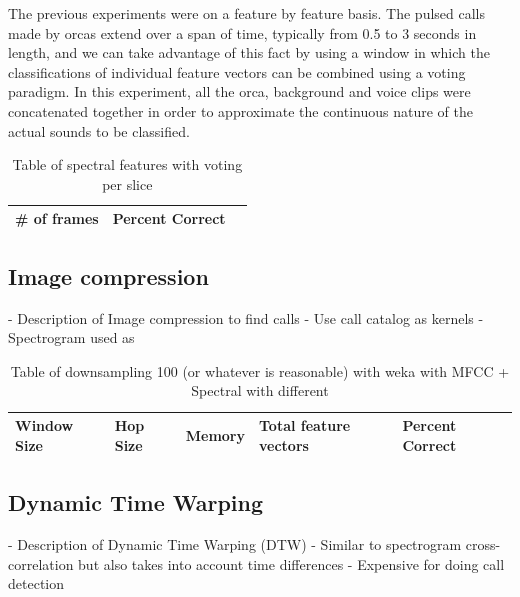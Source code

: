 \documentclass[12pt,oneside]{book}
\begin{document}
%
%

The previous experiments were on a feature by feature basis.  The
pulsed calls made by orcas extend over a span of time, typically from
0.5 to 3 seconds in length, and we can take advantage of this fact by
using a window in which the classifications of individual feature
vectors can be combined using a voting paradigm.  In this experiment,
all the orca, background and voice clips were concatenated together
in order to approximate the continuous nature of the actual sounds to
be classified.

\begin{table}
\begin{tabular}{|l|l|l|}
\hline
\# of frames & Percent Correct \\
\hline


\hline
\end{tabular}
\caption{Table of spectral features with voting per slice}
\label{table:obvVoting}
\end{table}


%
%

\subsection{Image compression}


- Description of Image compression to find calls
- Use call catalog as kernels
- Spectrogram used as 

\begin{table}
\begin{tabular}{|l|l|l|l|l|}
\hline
Window Size & Hop Size & Memory & Total feature vectors & Percent Correct \\
\hline


\hline
\end{tabular}
\caption{Table of downsampling 100 (or whatever is reasonable) with weka with
MFCC + Spectral with different}
\label{table:mfccSpectralWeka}
\end{table}


%
%

\subsection{Dynamic Time Warping}


- Description of Dynamic Time Warping (DTW)
- Similar to spectrogram cross-correlation but also takes into account
  time differences
- Expensive for doing call detection
\end{document}
